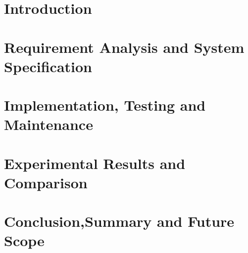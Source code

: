 \documentclass[12pt]{report}
\begin{document}

\begin{screen}
\ppttitle
\end{screen}
\footskip 0.7cm
\thispagestyle{empty} 
\pagetitle
\newpage
{}
\cfoot{\thepage}


\newpage



\newpage
\tableofcontents
\newpage
\listoffigures
\newpage

\cfoot{\thepage}

\newpage
\chapter{Introduction}

\newpage

\chapter{Requirement Analysis and System Specification}



\chapter{Implementation, Testing and Maintenance}

\chapter{Experimental Results and Comparison}

\chapter{Conclusion,Summary and Future Scope}


\printbibliography
\end{document}
